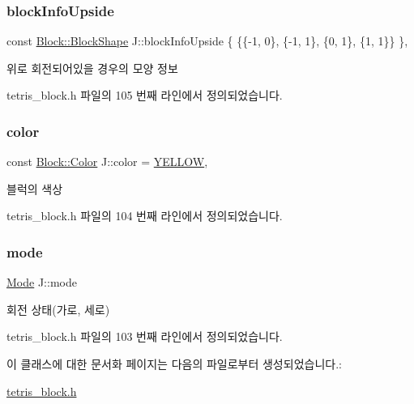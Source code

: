 \subsubsection{\texorpdfstring{block\+Info\+Upside}{blockInfoUpside}}
{\footnotesize\ttfamily const \mbox{\hyperlink{class_block_aca5d951639f113e2ebd7856209d6b9ab}{Block\+::\+Block\+Shape}} J\+::block\+Info\+Upside \{ \{\{-\/1, 0\}, \{-\/1, 1\}, \{0, 1\}, \{1, 1\}\} \}\hspace{0.3cm}{\ttfamily [static]}, {\ttfamily [private]}}



위로 회전되어있을 경우의 모양 정보 



tetris\+\_\+block.\+h 파일의 105 번째 라인에서 정의되었습니다.

\mbox{\label{class_j_adf3d9ba6faa25890b274cba9eabf02e5}} 
\subsubsection{\texorpdfstring{color}{color}}
{\footnotesize\ttfamily const \mbox{\hyperlink{class_block_ad054b4ac51df79aa910040b2a2fdf7b5}{Block\+::\+Color}} J\+::color = \mbox{\hyperlink{class_block_ad054b4ac51df79aa910040b2a2fdf7b5a7ae21b7c7ed4cd37d641a5119d0b3939}{Y\+E\+L\+L\+OW}}\hspace{0.3cm}{\ttfamily [static]}, {\ttfamily [private]}}



블럭의 색상 



tetris\+\_\+block.\+h 파일의 104 번째 라인에서 정의되었습니다.

\mbox{\label{class_j_a84f29c2144ce2c8ca0d369060589f0f4}} 
\subsubsection{\texorpdfstring{mode}{mode}}
{\footnotesize\ttfamily \mbox{\hyperlink{class_block_a33a96023993478ad4b52426188454765}{Mode}} J\+::mode\hspace{0.3cm}{\ttfamily [private]}}



회전 상태(가로, 세로) 



tetris\+\_\+block.\+h 파일의 103 번째 라인에서 정의되었습니다.



이 클래스에 대한 문서화 페이지는 다음의 파일로부터 생성되었습니다.\+:\begin{DoxyCompactItemize}
\item 
\mbox{\hyperlink{tetris__block_8h}{tetris\+\_\+block.\+h}}\end{DoxyCompactItemize}
